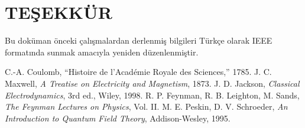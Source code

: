 \documentclass[conference,a4paper]{IEEEtran}
\begin{document}
\section*{TEŞEKKÜR}
Bu doküman önceki çalışmalardan derlenmiş bilgileri Türkçe olarak IEEE formatında sunmak amacıyla yeniden düzenlenmiştir.

\begin{thebibliography}{9}
 C.-A. Coulomb, ``Histoire de l'Académie Royale des Sciences,'' 1785.
 J. C. Maxwell, \textit{A Treatise on Electricity and Magnetism}, 1873.
 J. D. Jackson, \textit{Classical Electrodynamics}, 3rd ed., Wiley, 1998.
 R. P. Feynman, R. B. Leighton, M. Sands, \textit{The Feynman Lectures on Physics}, Vol. II.
 M. E. Peskin, D. V. Schroeder, \textit{An Introduction to Quantum Field Theory}, Addison-Wesley, 1995.
\end{thebibliography}
\end{document}
